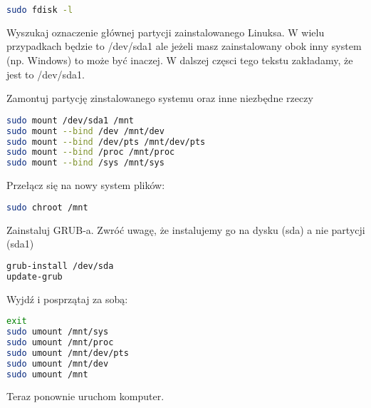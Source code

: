 \begin{lstlisting}[language=bash]
sudo fdisk -l
\end{lstlisting}

Wyszukaj oznaczenie głównej partycji zainstalowanego Linuksa. W wielu przypadkach będzie to /dev/sda1 ale jeżeli masz zainstalowany obok inny system (np. Windows) to może być inaczej. W dalszej częsci tego tekstu zakładamy, że jest to /dev/sda1.

Zamontuj partycję zinstalowanego systemu oraz inne niezbędne rzeczy
\begin{lstlisting}[language=bash]
sudo mount /dev/sda1 /mnt
sudo mount --bind /dev /mnt/dev
sudo mount --bind /dev/pts /mnt/dev/pts
sudo mount --bind /proc /mnt/proc
sudo mount --bind /sys /mnt/sys
\end{lstlisting}

Przełącz się na nowy system plików:

\begin{lstlisting}[language=bash]
sudo chroot /mnt
\end{lstlisting}

Zainstaluj GRUB-a. Zwróć uwagę, że instalujemy go na dysku (sda) a nie partycji (sda1)

\begin{lstlisting}[language=bash]
grub-install /dev/sda
update-grub
\end{lstlisting}

Wyjdź i posprzątaj za sobą:

\begin{lstlisting}[language=bash]
exit
sudo umount /mnt/sys
sudo umount /mnt/proc
sudo umount /mnt/dev/pts
sudo umount /mnt/dev
sudo umount /mnt
\end{lstlisting}

Teraz ponownie uruchom komputer.